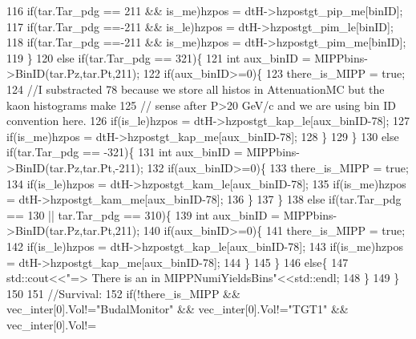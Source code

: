 \begin{DoxyCode}
116         \textcolor{keywordflow}{if}(tar.Tar\_pdg == 211 && is\_me)hzpos = dtH->hzpostgt\_pip\_me[binID];
117         \textcolor{keywordflow}{if}(tar.Tar\_pdg ==-211 && is\_le)hzpos = dtH->hzpostgt\_pim\_le[binID];
118         \textcolor{keywordflow}{if}(tar.Tar\_pdg ==-211 && is\_me)hzpos = dtH->hzpostgt\_pim\_me[binID];
119        \}
120        \textcolor{keywordflow}{else} \textcolor{keywordflow}{if}(tar.Tar\_pdg == 321)\{
121          \textcolor{keywordtype}{int} aux\_binID = MIPPbins->BinID(tar.Pz,tar.Pt,211);
122          \textcolor{keywordflow}{if}(aux\_binID>=0)\{
123            there\_is\_MIPP = \textcolor{keyword}{true};
124            \textcolor{comment}{//I substracted 78 because we store all histos in AttenuationMC but the kaon histograms make }
125            \textcolor{comment}{// sense after P>20 GeV/c and we are using bin ID convention here.}
126            \textcolor{keywordflow}{if}(is\_le)hzpos = dtH->hzpostgt\_kap\_le[aux\_binID-78];
127            \textcolor{keywordflow}{if}(is\_me)hzpos = dtH->hzpostgt\_kap\_me[aux\_binID-78];
128          \}
129        \}
130        \textcolor{keywordflow}{else} \textcolor{keywordflow}{if}(tar.Tar\_pdg == -321)\{
131          \textcolor{keywordtype}{int} aux\_binID = MIPPbins->BinID(tar.Pz,tar.Pt,-211);
132          \textcolor{keywordflow}{if}(aux\_binID>=0)\{
133            there\_is\_MIPP = \textcolor{keyword}{true};
134            \textcolor{keywordflow}{if}(is\_le)hzpos = dtH->hzpostgt\_kam\_le[aux\_binID-78];
135            \textcolor{keywordflow}{if}(is\_me)hzpos = dtH->hzpostgt\_kam\_me[aux\_binID-78];
136          \}
137        \}
138        \textcolor{keywordflow}{else} \textcolor{keywordflow}{if}(tar.Tar\_pdg == 130 || tar.Tar\_pdg == 310)\{
139          \textcolor{keywordtype}{int} aux\_binID = MIPPbins->BinID(tar.Pz,tar.Pt,211);
140          \textcolor{keywordflow}{if}(aux\_binID>=0)\{
141            there\_is\_MIPP = \textcolor{keyword}{true};
142            \textcolor{keywordflow}{if}(is\_le)hzpos = dtH->hzpostgt\_kap\_le[aux\_binID-78];
143            \textcolor{keywordflow}{if}(is\_me)hzpos = dtH->hzpostgt\_kap\_me[aux\_binID-78];
144          \}
145        \}
146        \textcolor{keywordflow}{else}\{
147          std::cout<<\textcolor{stringliteral}{"=> There is an in MIPPNumiYieldsBins"}<<std::endl;
148        \}
149     \}
150     
151     \textcolor{comment}{//Survival:}
152     \textcolor{keywordflow}{if}(!there\_is\_MIPP && vec\_inter[0].Vol!=\textcolor{stringliteral}{"BudalMonitor"} && vec\_inter[0].Vol!=\textcolor{stringliteral}{"TGT1"} && vec\_inter[0].Vol!=\textcolor{stringliteral}{
}
\end{DoxyCode}
